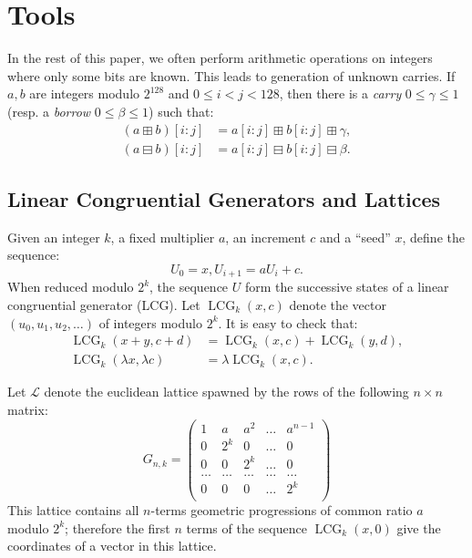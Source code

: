 \documentclass[submission,svgnames,journal=tosc]{iacrtrans}
\DeclareMathOperator{\LCG}{LCG}
\begin{document}
\section{Tools}
\label{sec:geometric}

In the rest of this paper, we often perform arithmetic operations on integers
where only some bits are known. This leads to generation of unknown carries. If
$a, b$ are integers modulo $2^{128}$ and $0\leq i<j<128$, then there is a
\emph{carry} $0 \leq \gamma \leq 1$ (resp. a \emph{borrow}
$0 \leq \beta \leq 1$) such that:
\begin{align}
  (a \boxplus b)[i:j]  &= a[i:j] \boxplus  b[i:j] \boxplus  \gamma, \label{eq:caryy}  \\
  (a \boxminus b)[i:j] &= a[i:j] \boxminus b[i:j] \boxminus \beta.  \label{eq:borrow}
\end{align}

\subsection{Linear Congruential Generators and Lattices}

Given an integer $k$, a fixed multiplier $a$, an increment $c$ and a ``seed''
$x$, define the sequence:
\[
  U_0 = x, U_{i+1} = a U_i + c.
\]
When reduced modulo $2^k$, the sequence $U$ form the successive states of a
linear congruential generator (LCG). Let $\LCG_{k}(x, c)$ denote the vector
$(u_0, u_1, u_2, \dots)$ of integers modulo $2^k$. It is easy to check that:
\begin{align}
\label{eq:lcg-additive}
\LCG_{k}(x + y, c + d) &= \LCG_{k}(x, c) + \LCG_{k}(y, d),  \\
\label{eq:lcg-scalar}
\LCG_{k}(\lambda x, \lambda c) &= \lambda \LCG_{k}(x, c).   
\end{align}

Let $\mathcal{L}$ denote the euclidean lattice spawned by the rows of the
following $n\times n$ matrix:
\[
  G_{n,k} = \begin{pmatrix}
    1 & a   & a^2 & \dots & a^{n-1} \\
    0 & 2^k & 0   & \dots & 0 \\
    0 & 0   & 2^k & \dots & 0 \\
    \dots & \dots & \dots & \dots & \dots\\
    0 & 0 & 0 & \dots & 2^k \\
  \end{pmatrix}
\]
This lattice contains all $n$-terms geometric progressions of common ratio $a$
modulo $2^k$; therefore the first $n$ terms of the sequence $\LCG_{k}(x, 0)$
give the coordinates of a vector in this lattice.
\end{document}
